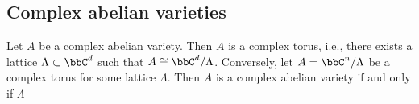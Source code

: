 \subsection{Complex abelian varieties}

    \begin{theorem}\label{thm: complex abelian varieties are complex tori}
        Let \(A\) be a complex abelian variety.
        Then \(A\) is a complex torus, i.e., there exists a lattice \(\Lambda \subset \bbC^d\) such that \(A \cong \bbC^d / \Lambda\).
        Conversely, let \(A = \bbC^n/\Lambda\) be a complex torus for some lattice \(\Lambda\).
        Then \(A\) is a complex abelian variety if and only if \(\Lambda\)  
    \end{theorem}


